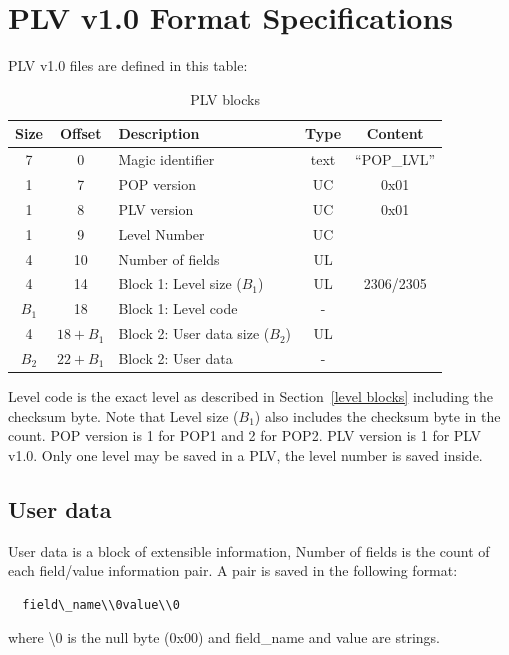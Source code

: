 \documentclass{article}
\begin{document}
\section{PLV v1.0 Format Specifications}

 PLV v1.0 files are defined in this table:

\begin{table}
\begin{tabular}{cclcc}
\hline
   Size&Offset&Description                 & Type  & Content \\
\hline
      7     & 0& Magic identifier            & text  & ``POP\_LVL'' \\
      1     & 7& POP version                 & UC    & 0x01 \\
      1     & 8& PLV version                 & UC    & 0x01 \\
      1     & 9& Level Number                & UC \\
      4    & 10& Number of fields            & UL \\
      4    & 14& Block 1: Level size ($B_1$)    & UL    & 2306/2305 \\
     $B_1$    & 18& Block 1: Level code         & - \\
      4 & $18+B_1$& Block 2: User data size ($B_2$)& UL \\
     $B_2$ & $22+B_1$& Block 2: User data          & - \\
\hline
\end{tabular}
\caption{PLV blocks}
\label{palettes table}
\end{table}

 Level code is the exact level as described in Section~\ref{level blocks} including the checksum
 byte. Note that Level size ($B_1$) also includes the checksum byte in the
 count.
 POP version is 1 for POP1 and 2 for POP2.
 PLV version is 1 for PLV v1.0.
 Only one level may be saved in a PLV, the level number is saved inside.

\subsection{User data}

 User data is a block of extensible information, Number of fields is the
 count of each field/value information pair. A pair is saved in the
 following format:
\begin{verbatim}
  field\_name\\0value\\0
\end{verbatim}
 where \textbackslash0 is the null byte (0x00) and field\_name and value are strings.
\end{document}
